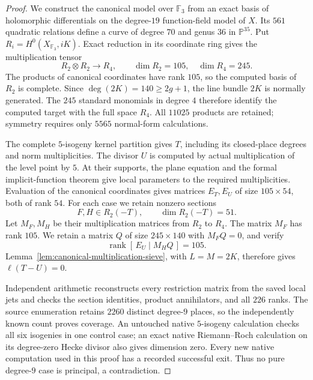 \begin{proof}
We construct the canonical model over $\mathbb F_3$ from an exact
basis of holomorphic differentials on the degree-$19$ function-field
model of $X$. Its $561$ quadratic relations define a curve of degree
$70$ and genus $36$ in $\mathbb P^{35}$. Put
$R_i=H^0(X_{\mathbb F_3},iK)$. Exact reduction in its coordinate
ring gives the multiplication tensor
\[
 R_2\otimes R_2\longrightarrow R_4,
 \qquad \dim R_2=105,\quad\dim R_4=245.
\]
The products of canonical coordinates have rank $105$, so the
computed basis of $R_2$ is complete. Since $\deg(2K)=140\geq2g+1$,
the line bundle $2K$ is normally generated. The $245$ standard
monomials in degree $4$ therefore identify the computed target with
the full space $R_4$. All $11025$ products are retained; symmetry
requires only $5565$ normal-form calculations.

The complete $5$-isogeny kernel partition gives $T$, including its
closed-place degrees and norm multiplicities. The divisor $U$ is
computed by actual multiplication of the level point by $5$.
At their supports, the plane equation and the formal implicit-function
theorem give local parameters to the required multiplicities.
Evaluation of the canonical coordinates gives matrices
$E_T,E_U$ of size $105\times54$, both of rank $54$.
For each case we retain nonzero sections
\[
 F,H\in R_2(-T),\qquad \dim R_2(-T)=51.
\]
Let $M_F,M_H$ be their multiplication matrices from $R_2$ to $R_4$.
The matrix $M_F$ has rank $105$. We retain a matrix $Q$ of size
$245\times140$ with $M_FQ=0$, and verify
\[
 \operatorname{rank}[\,E_U\mid M_HQ\,]=105.
\]
Lemma~\ref{lem:canonical-multiplication-sieve}, with $L=M=2K$,
therefore gives $\ell(T-U)=0$.

Independent arithmetic reconstructs every restriction matrix from
the saved local jets and checks the section identities, product
annihilators, and all $226$ ranks. The source enumeration retains
$2260$ distinct degree-$9$ places, so the independently known count
proves coverage. An untouched native $5$-isogeny calculation checks
all six isogenies in one control case; an exact native
Riemann--Roch calculation on its degree-zero Hecke divisor also
gives dimension zero. Every new native computation used in this proof
has a recorded successful exit. Thus no pure degree-$9$ case is
principal, a contradiction.
\end{proof}
